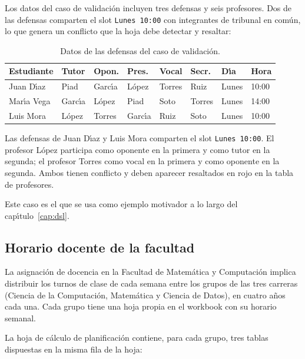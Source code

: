 Los datos del caso de validaci\'on incluyen tres defensas y seis profesores.
Dos de las defensas comparten el slot \texttt{Lunes~10:00} con integrantes
de tribunal en com\'un, lo que genera un conflicto que la hoja debe detectar
y resaltar:

\begin{table}[h!]
\centering
\caption{Datos de las defensas del caso de validaci\'on.}
\label{tab:datos-defensas}
\renewcommand{\arraystretch}{1.2}
\begin{tabular}{llllllll}
\hline
\textbf{Estudiante} & \textbf{Tutor} & \textbf{Opon.}
  & \textbf{Pres.} & \textbf{Vocal} & \textbf{Secr.}
  & \textbf{D\'{\i}a} & \textbf{Hora} \\
\hline
Juan D\'{\i}az  & Piad   & Garc\'{\i}a & L\'opez  & Torres & Ruiz   & Lunes & 10:00 \\
Mar\'{\i}a Vega & Garc\'{\i}a & L\'opez  & Piad   & Soto   & Torres & Lunes & 14:00 \\
Luis Mora   & L\'opez  & Torres & Garc\'{\i}a & Ruiz   & Soto   & Lunes & 10:00 \\
\hline
\end{tabular}
\end{table}

Las defensas de Juan D\'{\i}az y Luis Mora comparten el slot
\texttt{Lunes~10:00}.  El profesor L\'opez participa como oponente en la
primera y como tutor en la segunda; el profesor Torres como vocal en la
primera y como oponente en la segunda.  Ambos tienen conflicto y deben
aparecer resaltados en rojo en la tabla de profesores.

Este caso es el que se usa como ejemplo motivador a lo largo del cap\'{\i}tulo~\ref{cap:dsl}.

\subsection{Horario docente de la facultad}
\label{ssec:caso-facultad}

La asignaci\'on de docencia en la Facultad de Matem\'atica y Computaci\'on
implica distribuir los turnos de clase de cada semana entre los grupos de las
tres carreras (Ciencia de la Computaci\'on, Matem\'atica y Ciencia de Datos),
en cuatro a\~nos cada una.  Cada grupo tiene una hoja propia en el workbook
con su horario semanal.

La hoja de c\'alculo de planificaci\'on contiene, para cada grupo, tres tablas
dispuestas en la misma fila de la hoja:

